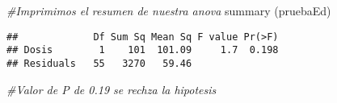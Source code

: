 \documentclass[
]{article}
\newenvironment{Shaded}{\begin{snugshade}}{\end{snugshade}}
\newcommand{\CommentTok}[1]{\textcolor[rgb]{0.56,0.35,0.01}{\textit{#1}}}
\newcommand{\FunctionTok}[1]{\textcolor[rgb]{0.00,0.00,0.00}{#1}}
\newcommand{\NormalTok}[1]{#1}
\begin{document}
\begin{Shaded}
\begin{Highlighting}[]
\CommentTok{\#Imprimimos el resumen de nuestra anova}
\FunctionTok{summary}\NormalTok{ (pruebaEd)}
\end{Highlighting}
\end{Shaded}

\begin{verbatim}
##             Df Sum Sq Mean Sq F value Pr(>F)
## Dosis        1    101  101.09     1.7  0.198
## Residuals   55   3270   59.46
\end{verbatim}

\begin{Shaded}
\begin{Highlighting}[]
\CommentTok{\#Valor de P de 0.19 se rechza la hipotesis}
\end{Highlighting}
\end{Shaded}
\end{document}
